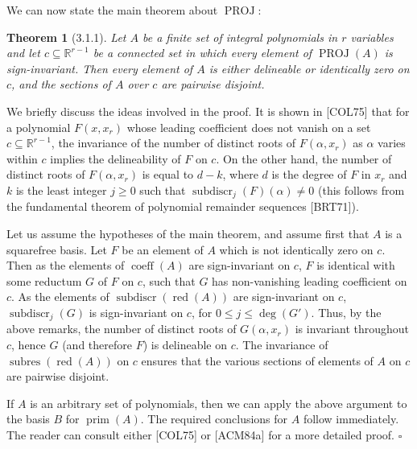 \documentclass[11pt]{article}
\theoremstyle{plain}
\newtheorem*{theorem*}{Theorem}
\theoremstyle{definition}
\newcommand{\R}{\mathbb{R}}
\DeclareMathOperator{\subres}{subres}
\DeclareMathOperator{\subdiscr}{subdiscr}
\DeclareMathOperator{\coeff}{coeff}
\DeclareMathOperator{\prm}{prim}
\DeclareMathOperator{\red}{red}
\DeclareMathOperator{\PROJ}{PROJ}
\begin{document}
We can now state the main theorem about $\PROJ$:

\begin{theorem*}[3.1.1]
Let $A$ be a finite set of integral polynomials in $r$ variables and
let $c \subseteq \R^{r-1}$ be a connected set in which every element of
$\PROJ(A)$ is sign-invariant. Then every element of $A$ is either
delineable or identically zero on $c$, and the sections of $A$ over $c$
are pairwise disjoint.
\end{theorem*}

We briefly discuss the ideas involved in the proof. It is shown in
[COL75] that for a polynomial $F(x, x_r)$ whose leading coefficient
does not vanish on a set $c \subseteq \R^{r-1}$, the invariance of the
number of distinct roots of $F(\alpha, x_r)$ as $\alpha$ varies within
$c$ implies the delineability of $F$ on $c$. On the other hand, the
number of distinct roots of $F(\alpha, x_r)$ is equal to $d - k$, where
$d$ is the degree of $F$ in $x_r$ and $k$ is the least integer
$j \ge 0$ such that $\subdiscr_j(F)(\alpha) \ne 0$ (this follows from
the fundamental theorem of polynomial remainder sequences [BRT71]).

Let us assume the hypotheses of the main theorem, and assume first that
$A$ is a squarefree basis. Let $F$ be an element of $A$ which is not
identically zero on $c$. Then as the elements of $\coeff(A)$ are
sign-invariant on $c$, $F$ is identical with some reductum $G$ of $F$
on $c$, such that $G$ has non-vanishing leading coefficient on $c$. As
the elements of $\subdiscr(\red(A))$ are sign-invariant on $c$,
$\subdiscr_j(G)$ is sign-invariant on $c$, for $0 \le j \le \deg(G')$.
Thus, by the above remarks, the number of distinct roots of
$G(\alpha, x_r)$ is invariant throughout $c$, hence $G$ (and therefore
$F$) is delineable on $c$. The invariance of $\subres(\red(A))$ on $c$
ensures that the various sections of elements of $A$ on $c$ are
pairwise disjoint.

If $A$ is an arbitrary set of polynomials, then we can apply the above
argument to the basis $B$ for $\prm(A)$. The required conclusions for
$A$ follow immediately. The reader can consult either [COL75] or
[ACM84a] for a more detailed proof. $\square$
\end{document}
